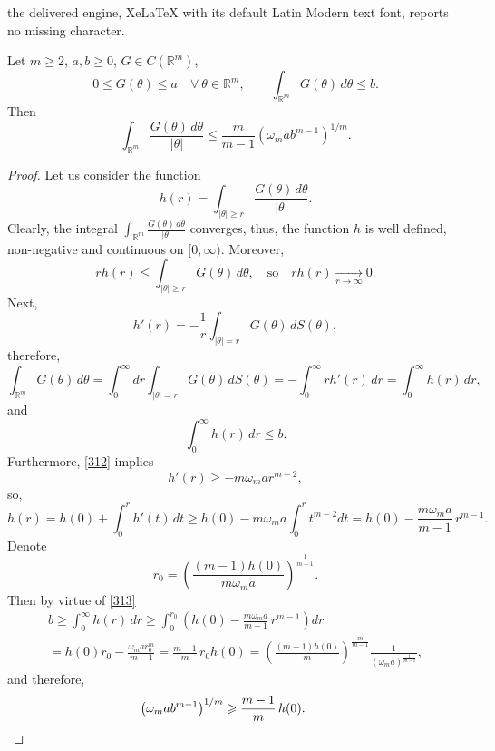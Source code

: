 \documentclass[10pt,a4paper]{amsart}
\def \R{\mathbb{R}}
\def \oo{\omega}
\def \te{\theta}
\renewcommand{\ge}{\geqslant}
\renewcommand{\le}{\leqslant}
\begin{document}
the delivered engine, XeLaTeX with its default Latin Modern text font, reports no missing character.
\begin{lemma}
\label{l312}
Let $m \ge 2$, $a,b \ge 0$, $G \in C(\R^m)$,
$$
0 \le G(\te) \le a \quad \forall \ \te \in \R^m, 
\qquad \int_{\R^m} G(\te) \, d\te \le b.
$$
Then
$$
\int_{\R^m} \frac{G(\te)\, d\te}{|\te|} \le 
\frac{m}{m-1} \left(\oo_m a b^{m-1}\right)^{1/m}.
$$
\end{lemma}

\begin{proof}
Let us consider the function
$$
h(r) = \int_{|\te| \ge r} \frac{G(\te)\, d\te}{|\te|}.
$$
Clearly, the integral $\int_{\R^m} \frac{G(\te)\, d\te}{|\te|}$ converges,
thus, the function $h$ is well defined, non-negative and continuous on $[0,\infty)$.
Moreover,
$$
r h(r) \le \int_{|\te| \ge r} G(\te)\, d\te, \quad \text{so} \quad
r h(r) \mathop{\longrightarrow}\limits_{r \to \infty} 0.
$$
Next,
\begin{equation}
\label{312}
h'(r) = - \frac1r \int_{|\te|=r} G(\te) \, dS(\te),
\end{equation}
therefore,
$$
\int_{\R^m} G(\te) \, d\te = \int_0^\infty dr \int_{|\te|=r} G(\te) \, dS(\te)
= - \int_0^\infty r h'(r)\, dr = \int_0^\infty h(r) \, dr,
$$
and
\begin{equation}
\label{313}
\int_0^\infty h(r) \, dr \le b.
\end{equation}
Furthermore, \eqref{312} implies
$$
h'(r) \ge - m \oo_m a r^{m-2},
$$
so,
$$
h(r) = h(0) + \int_0^r h'(t)\,dt
\ge h(0) - m \oo_m a \int_0^r t^{m-2} dt 
= h(0) - \frac{m \oo_m a}{m-1} \, r^{m-1}.
$$
Denote
$$
r_0 = \left(\frac{(m-1) h(0)}{m \oo_m a}\right)^{\frac1{m-1}}.
$$
Then by virtue of \eqref{313}
\begin{eqnarray*}
b \ge \int_0^\infty h(r)\, dr 
\ge \int_0^{r_0} \left(h(0) - \frac{m \oo_m a}{m-1} \, r^{m-1}\right) dr \\
= h(0) r_0 - \frac{\oo_m a r_0^m}{m-1}
= \frac{m-1}m \, r_0 h(0)
= \left(\frac{(m-1) h(0)}m\right)^{\frac{m}{m-1}} \frac1{(\oo_m a)^{\frac1{m-1}}},
\end{eqnarray*}
and therefore,
$$
\left(\oo_m a b^{m-1}\right)^{1/m} \ge \frac{m-1}m \, h(0).
\qquad \qedhere
$$
\end{proof}
\end{document}
